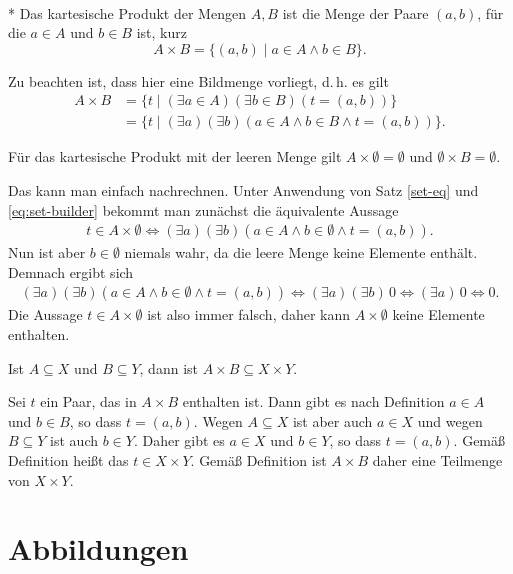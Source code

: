 \begin{Definition}\mbox{}\\*
Das kartesische Produkt der Mengen $A,B$ ist die Menge der
Paare $(a,b)$, für die $a\in A$ und $b\in B$ ist, kurz
\[A\times B = \{(a,b)\mid a\in A\land b\in B\}.\]
\end{Definition}
Zu beachten ist, dass hier eine Bildmenge vorliegt, d.\,h. es gilt
\begin{align*}
A\times B &= \{t\mid(\exists a\in A)(\exists b\in B)(t=(a,b))\}\\
&= \{t\mid(\exists a)(\exists b)(a\in A\land b\in B\land t=(a,b))\}.
\end{align*}

\begin{Satz}
Für das kartesische Produkt mit der leeren Menge gilt $A\times\emptyset=\emptyset$
und $\emptyset\times B=\emptyset$.
\end{Satz}
 Das kann man einfach nachrechnen.
Unter Anwendung von Satz \ref{set-eq} und \eqref{eq:set-builder}
bekommt man zunächst die äquivalente Aussage
\begin{gather*}
t\in A\times\emptyset \iff (\exists a)(\exists b)(a\in A\land b\in\emptyset\land t=(a,b)).
\end{gather*}
Nun ist aber $b\in\emptyset$ niemals wahr, da die leere Menge keine
Elemente enthält. Demnach ergibt sich
\begin{gather*}
(\exists a)(\exists b)(a\in A\land b\in\emptyset\land t=(a,b))
\iff (\exists a)(\exists b)\, 0 \iff (\exists a)\,0\iff 0.
\end{gather*}
Die Aussage $t\in A\times\emptyset$ ist also immer falsch,
daher kann $A\times\emptyset$ keine Elemente enthalten.\;\qedsymbol

\begin{Satz}
Ist $A\subseteq X$ und $B\subseteq Y$, dann ist
$A\times B\subseteq X\times Y$.
\end{Satz}
 Sei $t$ ein Paar, das in
$A\times B$ enthalten ist. Dann gibt es nach Definition
$a\in A$ und $b\in B$, so dass $t=(a,b)$. Wegen
$A\subseteq X$ ist aber auch $a\in X$ und wegen $B\subseteq Y$
ist auch $b\in Y$. Daher gibt es $a\in X$ und $b\in Y$, so dass
$t=(a,b)$. Gemäß Definition heißt das $t\in X\times Y$. Gemäß
Definition ist $A\times B$ daher eine Teilmenge von $X\times Y$.\;\qedsymbol

\newpage
\section{Abbildungen}
